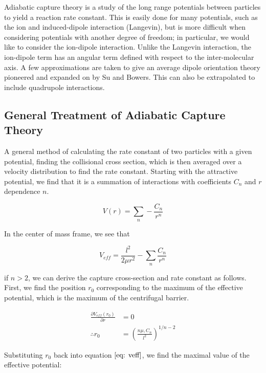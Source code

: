Adiabatic capture theory is a study of the long range potentials between particles to yield a reaction rate constant. This is easily done for many potentials, such as the ion and induced-dipole interaction (Langevin), but is more difficult when considering potentials with another degree of freedom; in particular, we would like to consider the ion-dipole interaction. Unlike the Langevin interaction, the ion-dipole term has an angular term defined with respect to the inter-molecular axis. A few approximations are taken to give an average dipole orientation theory pioneered and expanded on by Su and Bowers.\cite{Su1973, Su1973a} This can also be extrapolated to include quadrupole interactions.\cite{Su1975}

\subsection{General Treatment of Adiabatic Capture Theory} \label{sec: ACT}
A general method of calculating the rate constant of two particles with a given potential, finding the collisional cross section, which is then averaged over a velocity distribution to find the rate constant.\cite{Zhang2017} Starting with the attractive potential, we find that it is a summation of interactions with coefficients $C_n$ and $r$ dependence $n$.

\begin{equation}
    V(r) = \sum_n -\frac{C_n}{r^n}
\end{equation}

In the center of mass frame, we see that

\begin{equation}
    V_{eff} = \frac{l^2}{2 \mu r^2} - \sum_n \frac{C_n}{r^n}\label{eq: veff}
\end{equation}

if $n > 2$, we can derive the capture cross-section and rate constant as follows. First, we find the position $r_0$ corresponding to the maximum of the effective potential, which is the maximum of the centrifugal barrier.

\begin{align*}
    \frac{\partial V_{eff}(r_0)}{\partial r} & = 0 \\
    \therefore r_0 & = \left(\frac{n \mu, C_n}{l^2}\right)^{1/n-2}
\end{align*}

Substituting $r_0$ back into equation $\ref{eq: veff}$, we find the maximal value of the effective potential:

